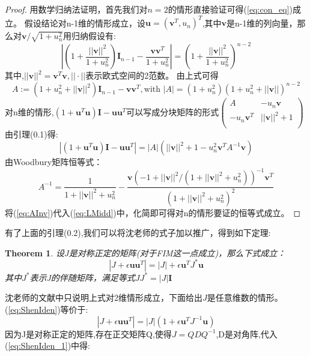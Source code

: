 \documentclass[12pt]{article}
\newtheorem{thm}{Theorem}[section]
\theoremstyle{remark}
\begin{document}
\begin{proof}
用数学归纳法证明，首先我们对$n=2$的情形直接验证可得(\ref{eq:con_eq})成立。
假设结论对n-1维的情形成立，设$\bm{u}=(\bm{v}^T,u_n)^T$,其中$\bm{v}$是n-1维的列向量，那么对$\bm{v}/\sqrt{1+u_n^2}$用归纳假设有:
\begin{equation}
|(1+\frac{||\bm{v}||^2}{1+u_n^2})\bm{I}_{n-1}-\frac{\bm{v}\bm{v}^T}{1+u_n^2}|=(1+\frac{||\bm{v}||^2}{1+u_n^2})^{n-2}
\end{equation}
其中,$||\bm{v}||^2=\bm{v}^T\bm{v},||\cdot||$表示欧式空间的2范数。
由上式可得
\begin{equation}
A:=(1+u_n^2+||\bm{v}||^2)\bm{I}_{n-1}-\bm{v}\bm{v}^T,\text{with }|A|=(1+u_n^2)(1+u_n^2+||\bm{v}||)^{n-2}
\end{equation}
对n维的情形,$(1+\bm{u}^T\bm{u})\bm{I}-\bm{u}\bm{u}^T$可以写成分块矩阵的形式$\left(\begin{array}{cc}
A&-u_n\bm{v}\\
-u_n\bm{v}^T&||\bm{v}||^2+1\\
\end{array}\right)$
由引理(0.1)得:
\begin{equation}\label{eq:LMidd}
|(1+\bm{u}^T\bm{u})\bm{I}-\bm{u}\bm{u}^T|=|A|(||\bm{v}||^2+1-u_n^2 \bm{v}^TA^{-1}\bm{v})
\end{equation}
由Woodbury矩阵恒等式：
\begin{equation}\label{eq:AInv}
A^{-1}=\frac{1}{1+||\bm{v}||^2+u_n^2}-\frac{\bm{v}(-1+||\bm{v}||^2/(1+||\bm{v}||^2+u_n^2))^{-1}\bm{v}^T}{(1+||\bm{v}||^2+u_n^2)^2}
\end{equation}
将(\ref{eq:AInv})代入(\ref{eq:LMidd})中，化简即可得对n的情形要证的恒等式成立。
\end{proof}
有了上面的引理(0.2),我们可以将沈老师的式子加以推广，得到如下定理:
\begin{thm}\label{thm:ShenIden}
设$J$是对称正定的矩阵(对于FIM这一点成立)，那么下式成立：
\begin{equation}\label{eq:ShenIden}
|J+\epsilon \bm{u}\bm{u}^T|=|J|+\epsilon \bm{u}^TJ^*\bm{u}
\end{equation}
其中$J^*$表示J的伴随矩阵，满足等式$JJ^*=|J|\bm{I}$
\end{thm}
沈老师的文献中只说明上式对2维情形成立，下面给出$J$是任意维数的情形。
(\ref{eq:ShenIden})等价于:
\begin{equation}\label{eq:ShenIden_1}
|J+\epsilon \bm{u}\bm{u}^T|=|J|(1+\epsilon \bm{u}^TJ^{-1}\bm{u})
\end{equation}
因为J是对称正定的矩阵,存在正交矩阵Q,使得$J=QDQ^{-1}$,D是对角阵,代入(\ref{eq:ShenIden_1})中得:
\end{document}
